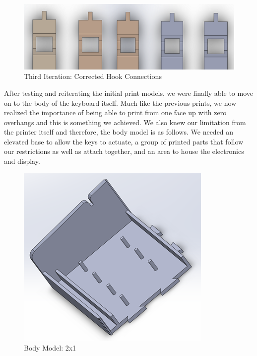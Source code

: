 \begin{figure}[h!]
  \centering
  \includegraphics[width=0.8\linewidth]{image/KeyModels.png}
  \caption{Third Iteration: Corrected Hook Connections}
  \label{fig:key_models}
\end{figure}

After testing and reiterating the initial print models, we were finally able to move on to the body of the keyboard itself. Much like the previous prints, we now realized the importance of being able to print from one face up with zero overhangs and this is something we achieved. We also knew our limitation from the printer itself and therefore, the body model is as follows. We needed an elevated base to allow the keys to actuate, a group of printed parts that follow our restrictions as well as attach together, and an area to house the electronics and display.

\begin{figure}[h!]
  \centering
  \includegraphics[width=0.8\linewidth]{image/BodyModel1.png}
  \caption{Body Model: 2x1}
  \label{fig:body_model1}
\end{figure}

